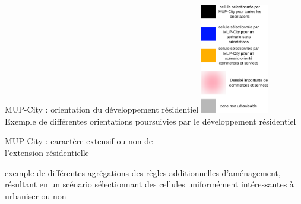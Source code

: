 \documentclass[xcolor=table]{beamer}
\begin{document}

\begin{frame}{MUP-City : orientation du développement résidentiel}
\vspace{1cm}
\hspace*{-0.5cm}
\includegraphics[width=3cm]{Images/legendAHP.png}
\\
{\footnotesize Exemple de différentes orientations poursuivies par le développement résidentiel}
\end{frame}


\begin{frame}{MUP-City : caractère extensif ou non de \\l'extension résidentielle}
\vspace{1cm}
\hspace*{-0.5cm}

{\footnotesize exemple de différentes agrégations des règles additionnelles d'aménagement, résultant en un scénario sélectionnant des cellules uniformément intéressantes à urbaniser ou non}
\end{frame}
\end{document}
